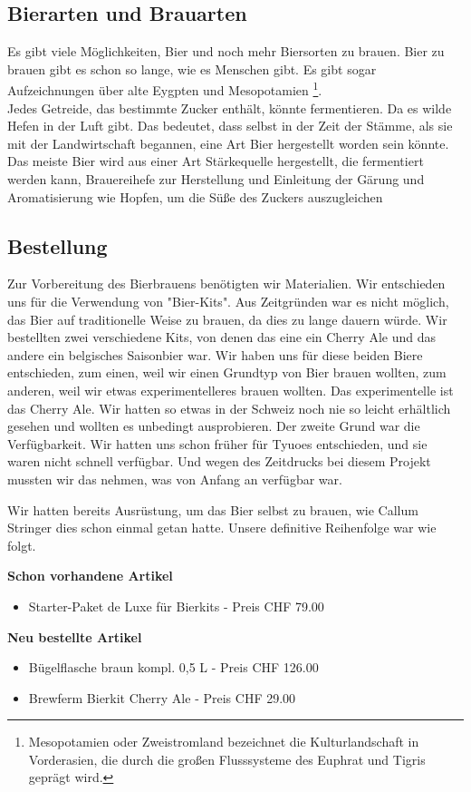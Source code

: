 \documentclass[12pt]{scrartcl}
\begin{document}
\subsection{Bierarten und Brauarten}
Es gibt viele Möglichkeiten, Bier und noch mehr Biersorten zu brauen.
Bier zu brauen gibt es schon so lange, wie es Menschen gibt. Es gibt sogar Aufzeichnungen über alte Eygpten und Mesopotamien \footnote{
	Mesopotamien oder Zweistromland bezeichnet die Kulturlandschaft in Vorderasien, die durch die großen Flusssysteme des Euphrat und Tigris geprägt wird.
}.\\
Jedes Getreide, das bestimmte Zucker enthält, könnte fermentieren. Da es wilde Hefen in der Luft gibt.
Das bedeutet, dass selbst in der Zeit der Stämme, als sie mit der Landwirtschaft begannen, eine Art Bier hergestellt worden sein könnte.\\
Das meiste Bier wird aus einer Art Stärkequelle hergestellt, die fermentiert werden kann, Brauereihefe zur Herstellung und Einleitung der
Gärung und Aromatisierung wie Hopfen, um die Süße des Zuckers auszugleichen



\subsection{Bestellung}
Zur Vorbereitung des Bierbrauens benötigten wir Materialien.
Wir entschieden uns für die Verwendung von "Bier-Kits". Aus Zeitgründen war es nicht möglich,
das Bier auf traditionelle Weise zu brauen, da dies zu lange dauern würde.
Wir bestellten zwei verschiedene Kits, von denen das eine ein Cherry Ale und das andere ein belgisches Saisonbier war.
Wir haben uns für diese beiden Biere entschieden, zum einen, weil wir einen Grundtyp von Bier brauen wollten, zum anderen, weil wir etwas experimentelleres brauen wollten.  Das experimentelle ist das Cherry Ale. Wir hatten so etwas in der Schweiz noch nie so leicht erhältlich gesehen und wollten es unbedingt ausprobieren.
Der zweite Grund war die Verfügbarkeit. Wir hatten uns schon früher für Tyuoes entschieden, und sie waren nicht schnell verfügbar. Und wegen des Zeitdrucks bei diesem Projekt mussten wir das nehmen, was von Anfang an verfügbar war.

Wir hatten bereits Ausrüstung, um das Bier selbst zu brauen, wie Callum Stringer dies schon einmal getan hatte.
Unsere definitive Reihenfolge war wie folgt.

\textbf{Schon vorhandene Artikel}
\begin{itemize}
	\item Starter-Paket de Luxe für Bierkits - Preis CHF 79.00
\end{itemize}
\textbf{Neu bestellte Artikel}
\begin{itemize}
	\item Bügelflasche braun kompl. 0,5 L - Preis CHF 126.00
	\item Brewferm Bierkit Cherry Ale - Preis CHF 29.00
\end{itemize}
\end{document}

